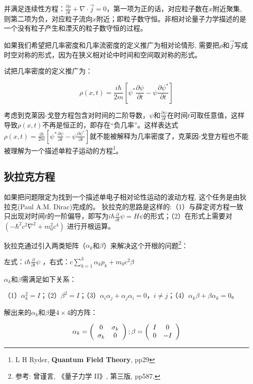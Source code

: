 并满足连续性方程：$\frac{\partial \rho}{\partial t} + \nabla \cdot
\vec{j} =0$，第一项为正的话，对应粒子数在$x$附近聚集,
则第二项为负，对应粒子流向$x$附近；即粒子数守恒。非相对论量子力学描述的是一个没有粒子产生和湮灭的粒子数守恒的过程。

如果我们希望把几率密度和几率流密度的定义推广为相对论情形,
需要把$\rho$和$\vec{j}$写成时空对称的形式，因为在狭义相对论中时间和空间取对称的形式。

试把几率密度的定义推广为：


\begin{equation*}
 \rho(x,t) = \frac{i \hbar}{2m}[\psi^* \frac{\partial \psi}{\partial
t} - \psi \frac{\partial \psi^*}{\partial t}]
\end{equation*}


考虑到克莱因-戈登方程包含对时间的二阶导数，$\psi$和$\frac{\partial
\psi}{\partial
t}$在时间$t$可取任意值，这样导致$\rho(x,t)$不再是恒正的，即存在``负几率''。这样表达式$\rho(x,t)
= \frac{i \hbar}{2m}[\psi^* \frac{\partial \psi}{\partial t} - \psi
\frac{\partial \psi^*}{\partial
t}]$就不能被解释为几率密度了，克莱因-戈登方程也不能被理解为一个描述单粒子运动的方程\footnote{L
H Ryder, \textbf{Quantum Field Theory}, pp29}。


\subsection{狄拉克方程}


如果把问题限定为找到一个描述单电子相对论性运动的波动方程,
这个任务是由狄拉克(Paul A.M. Dirac)完成的。
狄拉克的思路是这样的:（1）与薛定谔方程一致只出现对时间$t$的一阶偏导，即写为$i
\hbar \frac{\partial }{\partial t} \psi = H
\psi$的形式；（2）在形式上需要对$(- \hbar^2 c^2 \nabla^2 + m_0^2 c^4
)$ 进行开根运算。

狄拉克通过引入两类矩阵（$\alpha_k$和$\beta$）来解决这个开根的问题\footnote{参考:
曾谨言, 《量子力学 II》, 第三版, pp587.}：


左式：$i \hbar \frac{\partial}{\partial t} \psi$ ，右式：$c
\sum_{k=1}^{3} {\alpha_k p_k} + m_0 c^2 \beta$


$\alpha_k$和$\beta$需满足如下关系：


（1）$\alpha_k^2 = I$；（2）$\beta^2 = I$；（3）$\alpha_i \alpha_j +
\alpha_j \alpha_i =0$，$i \ne j$；（4）$\alpha_k \beta + \beta
\alpha_k =0$。


解出来的$\alpha_k$和$\beta$是$4 \times 4$的方阵：


\begin{equation*}
\alpha _k  = \left( {\begin{array}{*{20}c}
   0 & {\sigma _k }  \\
   {\sigma _k } & 0  \\
\end{array}} \right); \beta  = \left( {\begin{array}{*{20}c}
   I & 0  \\
   0 & { - I}  \\
\end{array}} \right)
\end{equation*}


